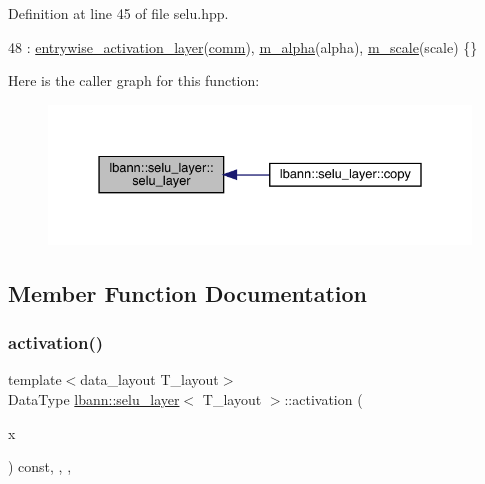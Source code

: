 Definition at line 45 of file selu.\+hpp.


\begin{DoxyCode}
48     : \hyperlink{classlbann_1_1entrywise__activation__layer_aada1d9200612dcd13259799ef327c557}{entrywise\_activation\_layer}(\hyperlink{file__io_8cpp_ab048c6f9fcbcfaa57ce68b00263dbebe}{comm}), \hyperlink{classlbann_1_1selu__layer_a72b22e92f3e70f6b996329e5b170554e}{m\_alpha}(alpha), 
      \hyperlink{classlbann_1_1selu__layer_a9575be8104b1b24232a2d167405e693a}{m\_scale}(scale) \{\}
\end{DoxyCode}
Here is the caller graph for this function\+:\nopagebreak
\begin{figure}[H]
\begin{center}
\leavevmode
\includegraphics[width=331pt]{classlbann_1_1selu__layer_ad71a99f25ddf2c07bc082a8e08f12cc2_icgraph}
\end{center}
\end{figure}


\subsection{Member Function Documentation}
\mbox{\label{classlbann_1_1selu__layer_a266c894e3e1ed4028c1acfe671773524}} 
\subsubsection{\texorpdfstring{activation()}{activation()}}
{\footnotesize\ttfamily template$<$data\+\_\+layout T\+\_\+layout$>$ \\
Data\+Type \hyperlink{classlbann_1_1selu__layer}{lbann\+::selu\+\_\+layer}$<$ T\+\_\+layout $>$\+::activation (\begin{DoxyParamCaption}\item[{Data\+Type}]{x }\end{DoxyParamCaption}) const\hspace{0.3cm}{\ttfamily [inline]}, {\ttfamily [override]}, {\ttfamily [protected]}, {\ttfamily [virtual]}}

